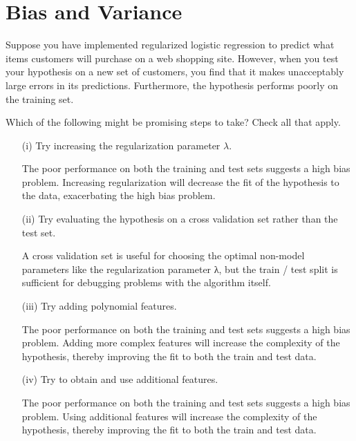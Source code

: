 \documentclass[]{article}
\begin{document}
\section*{Bias and Variance}

Suppose you have implemented regularized logistic regression to predict what items customers will purchase on a web shopping site. However, when you test your hypothesis on a new set of customers, you find that it makes unacceptably large errors in its predictions. Furthermore, the hypothesis performs poorly on the training set. 


\noindent Which of the following might be promising steps to take? Check all that apply.

\begin{itemize}
\item[(i)] Try increasing the regularization parameter $\lambda$.	

The poor performance on both the training and test sets suggests a high bias problem. Increasing regularization will decrease the fit of the hypothesis to the data, exacerbating the high bias problem.

\item[(ii)] Try evaluating the hypothesis on a cross validation set rather than the test set.

A cross validation set is useful for choosing the optimal non-model parameters like the regularization parameter λ, but the train / test split is sufficient for debugging problems with the algorithm itself.
\item[(iii)] Try adding polynomial features.	

	The poor performance on both the training and test sets suggests a high bias problem. Adding more complex features will increase the complexity of the hypothesis, thereby improving the fit to both the train and test data.
	
\item[(iv)]
Try to obtain and use additional features.	

The poor performance on both the training and test sets suggests a high bias problem. Using additional features will increase the complexity of the hypothesis, thereby improving the fit to both the train and test data.
\end{itemize}
\end{document}
